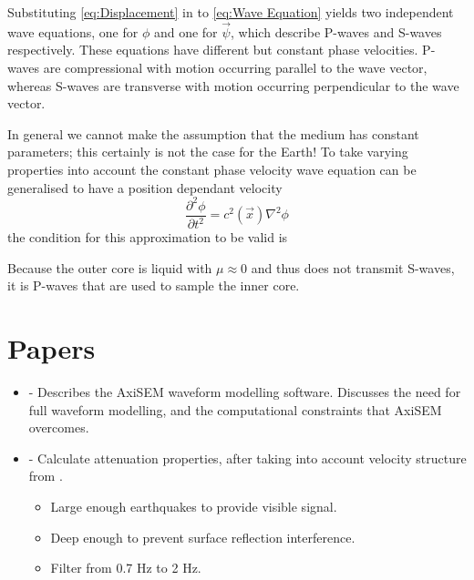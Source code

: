 \documentclass[11pt,a4paper]{article}
\begin{document}
Substituting \eqref{eq:Displacement} in to \eqref{eq:Wave Equation} yields two independent wave equations, one for $\phi$ and one for $\vec{\psi}$, which describe P-waves and S-waves respectively. These equations have different but constant phase velocities. P-waves are compressional with motion occurring parallel to the wave vector, whereas S-waves are transverse with motion occurring perpendicular to the wave vector.

In general we cannot make the assumption that the medium has constant parameters; this certainly is not the case for the Earth! To take varying properties into account the constant phase velocity wave equation can be generalised to have a position dependant velocity
\begin{equation}
	\frac{\partial^{2} \phi}{\partial t^{2}} = c^{2} \left ( \vec{x} \right ) \nabla^{2} \phi
\end{equation}
the condition for this approximation to be valid is 


Because the outer core is liquid with $\mu \approx 0$ and thus does not transmit S-waves, it is P-waves that are used to sample the inner core.

\section{Papers}
\begin{itemize}
	\item \cite{Nissen-Meyer2014} - Describes the AxiSEM waveform modelling software. Discusses the need for full waveform modelling, and the computational constraints that AxiSEM overcomes.

	\item \cite{Waszek2013a} - Calculate attenuation properties, after taking into account velocity structure from \cite{Waszek2011a}.
\begin{itemize}
	\item Large enough earthquakes to provide visible signal.
	\item Deep enough to prevent surface reflection interference.
	\item Filter from 0.7 Hz to 2 Hz.
\end{itemize}

\end{itemize}


\end{document}
